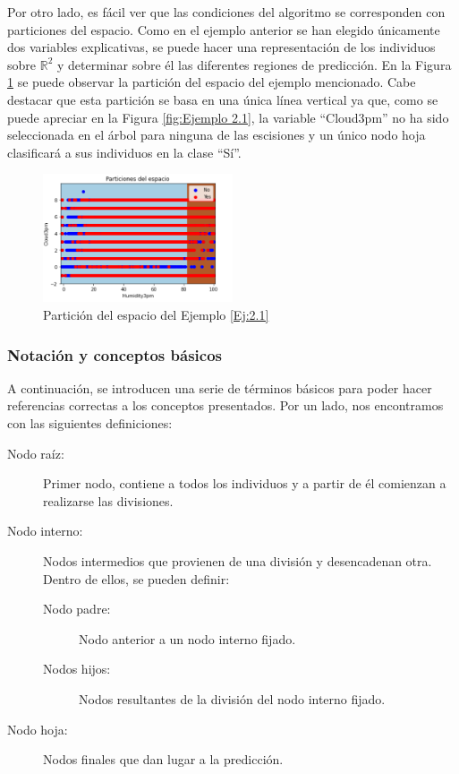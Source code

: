 \documentclass[12pt,twoside]{article}
\begin{document}
Por otro lado, es fácil ver que las condiciones del algoritmo se corresponden con particiones del espacio. Como en el ejemplo anterior se han elegido únicamente dos variables explicativas, se puede hacer una representación de los individuos sobre $\mathbb{R}^{2}$ y determinar sobre él las diferentes regiones de predicción. En la Figura \ref{fig:Ejemplo 2.1.2} se puede observar la partición del espacio del ejemplo mencionado. Cabe destacar que esta partición se basa en una única línea vertical ya que, como se puede apreciar en la Figura \ref{fig:Ejemplo 2.1}, la variable ``Cloud3pm'' no ha sido seleccionada en el árbol para ninguna de las escisiones y un único nodo hoja clasificará a sus individuos en la clase ``Sí''.
\begin{figure}[h]
	\centering
	\includegraphics[width = 0.5\textwidth]{ex2_1_02}
	\caption{Partición del espacio del Ejemplo \ref{Ej:2.1}}
	\label{fig:Ejemplo 2.1.2}
\end{figure}


\subsubsection{Notación y conceptos básicos}

A continuación, se introducen una serie de términos básicos para poder hacer referencias correctas a los conceptos presentados. Por un lado, nos encontramos con las siguientes definiciones:
\begin{description}
\item[Nodo raíz: ]Primer nodo, contiene a todos los individuos y a partir de él comienzan a realizarse las divisiones.
\item[Nodo interno: ]Nodos intermedios que provienen de una división y desencadenan otra. Dentro de ellos, se pueden definir:
	\begin{description}
	\item[Nodo padre: ]Nodo anterior a un nodo interno fijado.
	\item[Nodos hijos: ]Nodos resultantes de la división del nodo interno fijado.
	\end{description}
\item[Nodo hoja: ]Nodos finales que dan lugar a la predicción.
\end{description}
\end{document}
